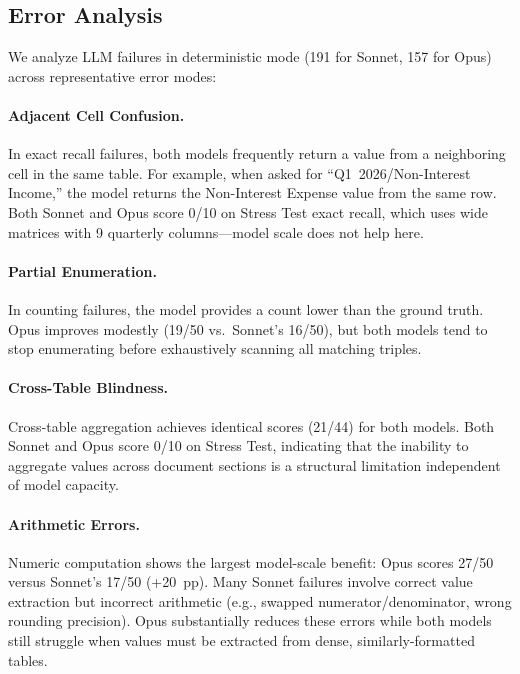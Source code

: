 \documentclass[11pt]{article}
\begin{document}
\subsection{Error Analysis}
\label{sec:errors}

We analyze LLM failures in deterministic mode (191 for Sonnet, 157 for
Opus) across representative error modes:

\paragraph{Adjacent Cell Confusion.}
In exact recall failures, both models frequently return a value from a
neighboring cell in the same table.  For example, when asked for
``Q1~2026/Non-Interest Income,'' the model returns the Non-Interest
Expense value from the same row.  Both Sonnet and Opus score 0/10 on
Stress Test exact recall, which uses wide matrices with 9 quarterly
columns---model scale does not help here.

\paragraph{Partial Enumeration.}
In counting failures, the model provides a count lower than the ground
truth.  Opus improves modestly (19/50 vs.\ Sonnet's 16/50), but
both models tend to stop enumerating before exhaustively scanning all
matching triples.

\paragraph{Cross-Table Blindness.}
Cross-table aggregation achieves identical scores (21/44) for both
models.  Both Sonnet and Opus score 0/10 on Stress Test, indicating
that the inability to aggregate values across document sections is a
structural limitation independent of model capacity.

\paragraph{Arithmetic Errors.}
Numeric computation shows the largest model-scale benefit: Opus scores
27/50 versus Sonnet's 17/50 (+20~pp).  Many Sonnet failures involve
correct value extraction but incorrect arithmetic (e.g., swapped
numerator/denominator, wrong rounding precision).  Opus substantially
reduces these errors while both models still struggle when values must
be extracted from dense, similarly-formatted tables.
\end{document}
